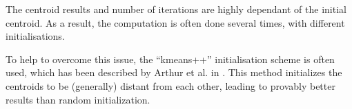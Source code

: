 The centroid results and number of iterations are highly dependant of the initial centroid. As a result, the computation is often done several times, with different initialisations.

To help to overcome this issue, the \enquote{kmeans++} initialisation scheme is often used, which has been described by Arthur et al. in \cite{Arthur2007}. This method initializes the centroids to be (generally) distant from each other, leading to provably better results than random initialization.
